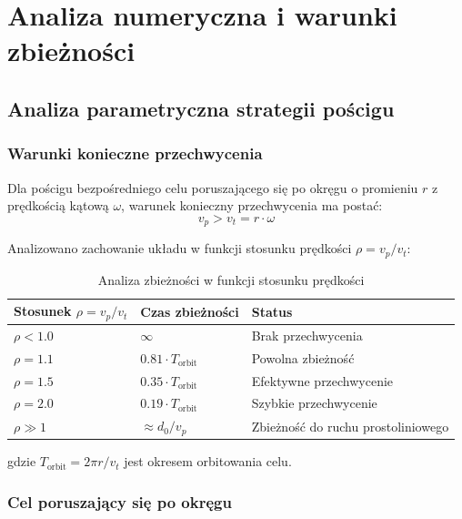 \documentclass[12pt,a4paper]{article}
\begin{document}
\section{Analiza numeryczna i warunki zbieżności}


\subsection{Analiza parametryczna strategii pościgu}

\subsubsection{Warunki konieczne przechwycenia}

Dla pościgu bezpośredniego celu poruszającego się po okręgu o promieniu $r$ z prędkością kątową $\omega$, warunek konieczny przechwycenia ma postać:
\begin{equation}
v_p > v_t = r \cdot \omega
\label{eq:capture_condition}
\end{equation}

Analizowano zachowanie układu w funkcji stosunku prędkości $\rho = v_p/v_t$:

\begin{table}[H]
\centering
\caption{Analiza zbieżności w funkcji stosunku prędkości}
\label{tab:velocity_ratio_analysis}
\begin{tabular}{@{}lll@{}}
\toprule
\textbf{Stosunek $\rho = v_p/v_t$} & \textbf{Czas zbieżności} & \textbf{Status} \\ \midrule
$\rho < 1.0$ & $\infty$ & Brak przechwycenia \\
$\rho = 1.1$ & $0.81 \cdot T_{\text{orbit}}$ & Powolna zbieżność \\
$\rho = 1.5$ & $0.35 \cdot T_{\text{orbit}}$ & Efektywne przechwycenie \\
$\rho = 2.0$ & $0.19 \cdot T_{\text{orbit}}$ & Szybkie przechwycenie \\
$\rho \gg 1$ & $\approx d_0/v_p$ & Zbieżność do ruchu prostoliniowego \\ \bottomrule
\end{tabular}
\end{table}

gdzie $T_{\text{orbit}} = 2\pi r/v_t$ jest okresem orbitowania celu.

\subsubsection{Cel poruszający się po okręgu}
\end{document}
